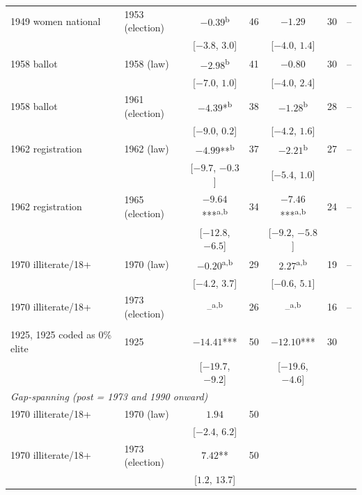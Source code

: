 \begin{tabular}{llcrcrc}
1949 women national & 1953 (election) & $-0.39$\textsuperscript{b} & 46 & $-1.29$ & 30 & -- \\
 & & [$-3.8$, $3.0$] & & [$-4.0$, $1.4$] & &  \\
1958 ballot & 1958 (law) & $-2.98$\textsuperscript{b} & 41 & $-0.80$ & 30 & -- \\
 & & [$-7.0$, $1.0$] & & [$-4.0$, $2.4$] & &  \\
1958 ballot & 1961 (election) & $-4.39$*\textsuperscript{b} & 38 & $-1.28$\textsuperscript{b} & 28 & -- \\
 & & [$-9.0$, $0.2$] & & [$-4.2$, $1.6$] & &  \\
1962 registration & 1962 (law) & $-4.99$**\textsuperscript{b} & 37 & $-2.21$\textsuperscript{b} & 27 & -- \\
 & & [$-9.7$, $-0.3$] & & [$-5.4$, $1.0$] & &  \\
1962 registration & 1965 (election) & $-9.64$***\textsuperscript{a,b} & 34 & $-7.46$***\textsuperscript{a,b} & 24 & -- \\
 & & [$-12.8$, $-6.5$] & & [$-9.2$, $-5.8$] & &  \\
1970 illiterate/18+ & 1970 (law) & $-0.20$\textsuperscript{a,b} & 29 & $2.27$\textsuperscript{a,b} & 19 & -- \\
 & & [$-4.2$, $3.7$] & & [$-0.6$, $5.1$] & &  \\
1970 illiterate/18+ & 1973 (election) & --\textsuperscript{a,b} & 26 & --\textsuperscript{a,b} & 16 & -- \\
 & &  & &  & &  \\
\midrule
1925, 1925 coded as 0\% elite & 1925 & $-14.41$*** & 50 & $-12.10$*** & 30 & \\
 & & [$-19.7$, $-9.2$] & & [$-19.6$, $-4.6$] & & \\
\midrule
\multicolumn{7}{l}{\textit{Gap-spanning (post = 1973 and 1990 onward)}} \\
1970 illiterate/18+ & 1970 (law) & $1.94$ & 50 & & & \\
 & & [$-2.4$, $6.2$] & & & & \\
1970 illiterate/18+ & 1973 (election) & $7.42$** & 50 & & & \\
 & & [$1.2$, $13.7$] & & & & \\
\bottomrule
\end{tabular}
